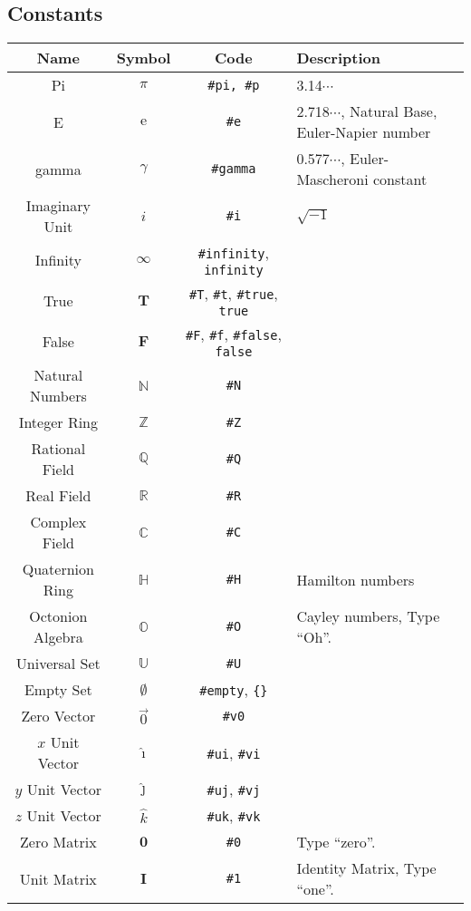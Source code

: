 \documentclass{article}
\begin{document}
  \subsection{Constants} %
  \label{sub:constants}
  \begin{table}[!h]
    \centering
    \begin{tabular}{|c|c|c|l|}
      \hline
      \textbf{Name} & \textbf{Symbol} & \textbf{Code} & \textbf{Description} \\
      \hline\hline
      Pi & \( \pi \) & \texttt{\#pi, \#p} & 3.14\(\cdots\)\\
      E & \( \mathrm{e} \) & \texttt{\#e} & 2.718\(\cdots\), Natural Base, Euler-Napier number \\
      gamma & \( \gamma \) & \texttt{\#gamma} & 0.577\(\cdots\), Euler-Mascheroni constant\\
      Imaginary Unit & \( i \) & \texttt{\#i} & \( \sqrt{-1} \) \\
      Infinity & \( \infty \) & \texttt{\#infinity}, \texttt{infinity} & \\
      \hline
      True & \( \mathbf{T} \) & \texttt{\#T}, \texttt{\#t}, \texttt{\#true}, \texttt{true} & \\
      False & \( \mathbf{F} \) & \texttt{\#F}, \texttt{\#f}, \texttt{\#false}, \texttt{false} & \\
      \hline
      Natural Numbers & \( \mathbb{N} \) & \texttt{\#N} & \\
      Integer Ring & \( \mathbb{Z} \) & \texttt{\#Z} & \\
      Rational Field & \( \mathbb{Q} \) & \texttt{\#Q} & \\
      Real Field & \( \mathbb{R} \) & \texttt{\#R} & \\
      Complex Field & \( \mathbb{C} \) & \texttt{\#C} & \\
      Quaternion Ring & \( \mathbb{H} \) & \texttt{\#H} & Hamilton numbers\\
      Octonion Algebra & \( \mathbb{O} \) & \texttt{\#O} & Cayley numbers, Type ``Oh''.\\
      \hline
      Universal Set & \( \mathbb{U} \) & \texttt{\#U} & \\
      Empty Set & \( \emptyset \) & \texttt{\#empty}, \texttt{\{\}} & \\
      \hline
      Zero Vector & \( \vec0 \) & \texttt{\#v0} & \\
      \( x \) Unit Vector & \( \hat\imath \) & \texttt{\#ui}, \texttt{\#vi} & \\
      \( y \) Unit Vector & \( \hat\jmath \) & \texttt{\#uj}, \texttt{\#vj} & \\
      \( z \) Unit Vector & \( \hat{k} \) & \texttt{\#uk}, \texttt{\#vk} & \\
      \hline
      Zero Matrix & \( \mathbf{0} \) & \texttt{\#0} & Type ``zero''.\\
      Unit Matrix & \( \mathbf{I} \) & \texttt{\#1} & Identity Matrix, Type ``one''.\\
      \hline
    \end{tabular}
  \end{table}
\end{document}
